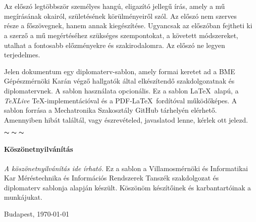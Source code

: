 \chapter*{\eloszo}

Az előszó legtöbbször személyes hangú, eligazító jellegű írás, amely a mű megírásának okairól, születésének körülményeiről szól. Az előszó nem szerves része a főszövegnek, hanem annak kiegészítése.
Ugyancsak az előszóban fejtheti ki a szerző a mű megértéséhez szükséges szempontokat, a követett módszereket, utalhat a fontosabb előzményekre és szakirodalomra.
Az előszó ne legyen terjedelmes.


Jelen dokumentum egy diplomaterv-sablon, amely formai keretet ad a BME Gépészmérnöki Karán végző hallgatók által elkészítendő szakdolgozatnak és diplomatervnek. A sablon használata opcionális. Ez a sablon \LaTeX~alapú, a \emph{TeXLive} \TeX-implementációval és a PDF-\LaTeX~fordítóval működőképes.
A sablon forrása a Mechatronika Szakosztály GitHub tárhelyén\footnotemark{} elérhető. Amennyiben hibát találtál, vagy észrevételed, javaslatod lenne, kérlek ott jelezd.


\begin{center}
    $\thicksim \; \thicksim \; \thicksim$
\end{center}



\subsubsection*{Köszönetnyilvánítás}
\emph{A köszönetnyilvánítás ide írható.} Ez a sablon a Villamosmérnöki és Informatikai Kar Méréstechnika és Információs Rendszerek Tanszék szakdolgozat és diplomaterv sablonja alapján készült. Köszönöm készítőinek és karbantartóinak a munkájukat.


\vspace{0.5cm}

\begin{flushleft}
    {Budapest, \today}
\end{flushleft}

\begin{flushright}
    \emph{\authorName}
\end{flushright}

\vfill
